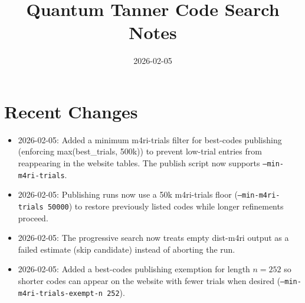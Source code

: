 \documentclass{article}
\title{Quantum Tanner Code Search Notes}
\date{2026-02-05}
\begin{document}
\maketitle

\section*{Recent Changes}
\begin{itemize}
  \item 2026-02-05: Added a minimum m4ri-trials filter for best-codes publishing
    (enforcing max(best\_trials, 500k)) to prevent low-trial entries from
    reappearing in the website tables. The publish script now supports
    \texttt{--min-m4ri-trials}.
  \item 2026-02-05: Publishing runs now use a 50k m4ri-trials floor
    (\texttt{--min-m4ri-trials 50000}) to restore previously listed codes
    while longer refinements proceed.
  \item 2026-02-05: The progressive search now treats empty dist-m4ri output
    as a failed estimate (skip candidate) instead of aborting the run.
  \item 2026-02-05: Added a best-codes publishing exemption for length
    $n=252$ so shorter codes can appear on the website with fewer trials
    when desired (\texttt{--min-m4ri-trials-exempt-n 252}).
\end{itemize}
\end{document}
